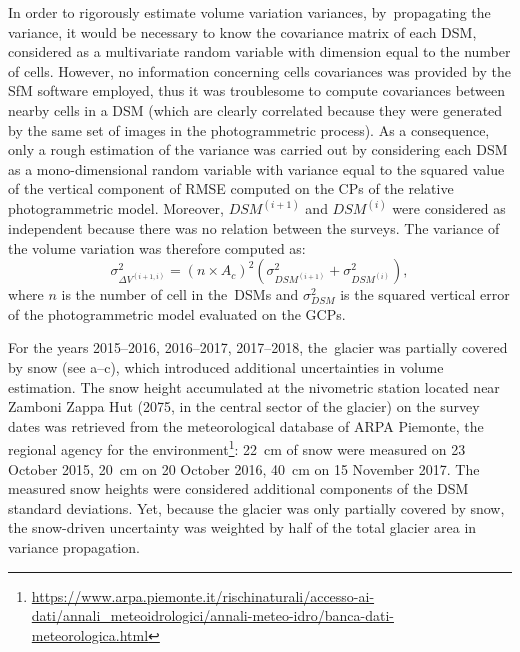 In order to rigorously estimate volume variation variances, by~propagating the variance,
it would be  necessary to know the covariance matrix of each DSM, considered as a
multivariate random variable with dimension equal to the number of cells.
However, no information concerning cells covariances was provided by the SfM software
employed, thus it was troublesome to compute covariances between nearby cells in a DSM
(which are clearly correlated because they were generated by the same set of images in
the photogrammetric process).
As a consequence, only a rough estimation of the variance was carried out by considering
each DSM as a mono-dimensional random variable with variance equal to the squared value
of the vertical component of RMSE computed on the CPs of the relative photogrammetric
model.
Moreover, $ DSM^{(i+1)} $ and $ DSM^{(i)} $ were considered as independent because there
was no relation between the surveys.
The variance of the volume variation was therefore computed as:
\begin{equation}
    \sigma^2_{\Delta V^{(i+1,i)}}  = {(n \times A_c)}^2 \left( \sigma^2
    _{DSM^{(i+1)}} + \sigma^2_{DSM^{(i)}} \right),
    \label{eq:3:volVarProp}
\end{equation}
where $ n $ is the number of cell in the~DSMs and $ \sigma^2 _{DSM}$ is the squared
vertical error of the photogrammetric model evaluated on the GCPs.

For the years 2015--2016, 2016--2017, 2017--2018, the~glacier was partially covered by
snow (see a--c), which introduced additional uncertainties in
volume estimation.
The snow height accumulated at the nivometric station located near Zamboni Zappa Hut
(\SI{2075}{\masl}, in the central sector of the glacier) on the survey dates was retrieved
from the meteorological database of ARPA Piemonte, the regional agency for the
environment\footnote{\url{https://www.arpa.piemonte.it/rischinaturali/accesso-ai-dati/annali_meteoidrologici/annali-meteo-idro/banca-dati-meteorologica.html}}: 
\SI{22}{\centi\meter} of snow were measured on 23 October
2015, \SI{20}{\centi\meter} on 20 October 2016, \SI{40}{\centi\meter} on 15 November 2017.
The measured snow heights were considered additional components of the DSM standard
deviations.
Yet, because the glacier was only partially covered by snow, the snow-driven uncertainty
was weighted by half of the total glacier area in variance propagation.


